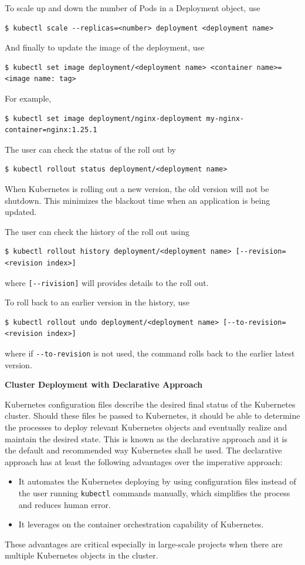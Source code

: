 To scale up and down the number of Pods in a Deployment object, use
\begin{lstlisting}
$ kubectl scale --replicas=<number> deployment <deployment name>
\end{lstlisting}

And finally to update the image of the deployment, use
\begin{lstlisting}
$ kubectl set image deployment/<deployment name> <container name>=<image name: tag>
\end{lstlisting}
For example,
\begin{lstlisting}
$ kubectl set image deployment/nginx-deployment my-nginx-container=nginx:1.25.1
\end{lstlisting}

The user can check the status of the roll out by
\begin{lstlisting}
$ kubectl rollout status deployment/<deployment name>
\end{lstlisting}
When Kubernetes is rolling out a new version, the old version will not be shutdown. This minimizes the blackout time when an application is being updated.

The user can check the history of the roll out using
\begin{lstlisting}
$ kubectl rollout history deployment/<deployment name> [--revision=<revision index>]
\end{lstlisting}
where \verb|[--rivision]| will provides details to the roll out.

To roll back to an earlier version in the history, use
\begin{lstlisting}
$ kubectl rollout undo deployment/<deployment name> [--to-revision=<revision index>]
\end{lstlisting}
where if \verb|--to-revision| is not used, the command rolls back to the earlier latest version.

\vspace{0.1in}
\noindent \textbf{Cluster Deployment with Declarative Approach}
\vspace{0.1in}

Kubernetes configuration files describe the desired final status of the Kubernetes cluster. Should these files be passed to Kubernetes, it should be able to determine the processes to deploy relevant Kubernetes objects and eventually realize and maintain the desired state. This is known as the declarative approach and it is the default and recommended way Kubernetes shall be used. The declarative approach has at least the following advantages over the imperative approach:
\begin{itemize}
  \item It automates the Kubernetes deploying by using configuration files instead of the user running \verb|kubectl| commands manually, which simplifies the process and reduces human error.
  \item It leverages on the container orchestration capability of Kubernetes.
\end{itemize}
These advantages are critical especially in large-scale projects when there are multiple Kubernetes objects in the cluster.

